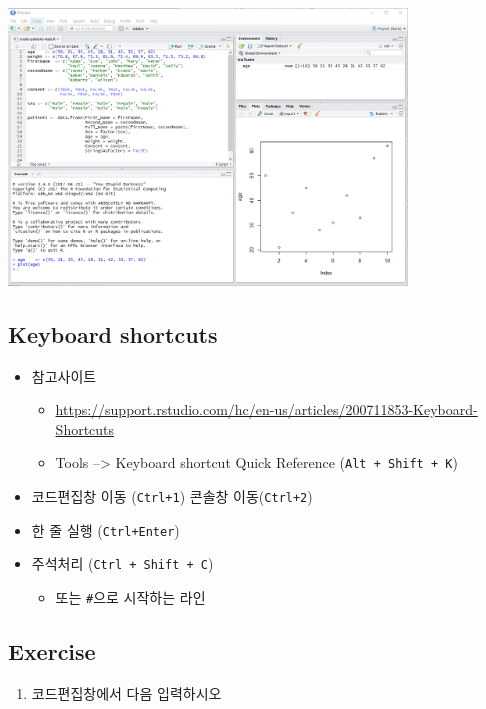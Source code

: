 \documentclass[
]{book}
\providecommand{\tightlist}{%
  \setlength{\itemsep}{0pt}\setlength{\parskip}{0pt}}
\begin{document}
\includegraphics[width=4.16667in,height=\textheight]{images/01/01-11.PNG}

\hypertarget{keyboard-shortcuts}{%
\subsection{Keyboard shortcuts}\label{keyboard-shortcuts}}

\begin{itemize}
\tightlist
\item
  참고사이트

  \begin{itemize}
  \tightlist
  \item
    \url{https://support.rstudio.com/hc/en-us/articles/200711853-Keyboard-Shortcuts}
  \item
    Tools --\textgreater{} Keyboard shortcut Quick Reference (\texttt{Alt\ +\ Shift\ +\ K})
  \end{itemize}
\item
  코드편집창 이동 (\texttt{Ctrl+1}) 콘솔창 이동(\texttt{Ctrl+2})
\item
  한 줄 실행 (\texttt{Ctrl+Enter})
\item
  주석처리 (\texttt{Ctrl\ +\ Shift\ +\ C})

  \begin{itemize}
  \tightlist
  \item
    또는 \texttt{\#}으로 시작하는 라인
  \end{itemize}
\end{itemize}

\hypertarget{exercise}{%
\subsection{Exercise}\label{exercise}}

\begin{enumerate}
\def\labelenumi{\arabic{enumi}.}
\tightlist
\item
  코드편집창에서 다음 입력하시오
\end{enumerate}
\end{document}
